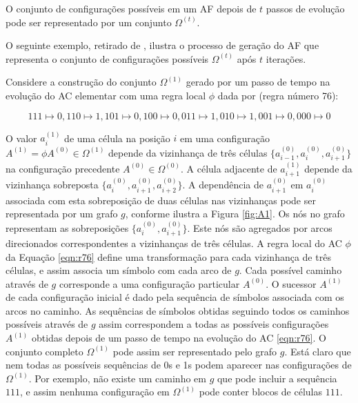 \documentclass[12pt,a4paper]{article}
\begin{document}
O conjunto de configurações possíveis em um AF depois de $t$
passos de evolução pode ser representado por um conjunto $\Omega^{(t)}$.

O seguinte exemplo, retirado de , ilustra o processo de
geração do AF que representa o conjunto de configurações
possíveis $\Omega^{(t)}$ após $t$ iterações.

Considere a construção do conjunto $\Omega^{(1)}$ gerado por um passo de
tempo na evolução do AC elementar com uma regra
local $\phi$ dada por (regra número 76):

\begin{equation}\label{eqn:r76}
111 \mapsto 0, 110 \mapsto 1, 101 \mapsto 0, 100 \mapsto 0, 011 \mapsto 1, 010 \mapsto 1,
001 \mapsto 0, 000 \mapsto 0
\end{equation}

O valor $a_i^{(1)}$ de uma célula na posição $i$ em uma configuração
$A^{(1)} = \phi A^{(0)} \in \Omega^{(1)}$ depende da vizinhança de três
células $\{a_{i-1}^{(0)},a_i^{(0)},a_{i+1}^{(0)}\}$ na configuração precedente
$A^{(0)} \in \Omega^{(0)}$. A célula adjacente de $a_{i+1}^{(1)}$ depende da
vizinhança sobreposta $\{a_i^{(0)},a_{i+1}^{(0)},a_{i+2}^{(0)}\}$. A
dependência de $a_{i+1}^{(0)}$ em $a_i^{(0)}$ associada com esta sobreposição
de duas células nas vizinhanças pode ser representada por um grafo $g$, conforme
ilustra a Figura \ref{fig:A1}. Os nós no grafo representam as sobreposições
$\{a_i^{(0)},a_{i+1}^{(0)}\}$. Este nós são agregados por arcos direcionados
correspondentes a vizinhanças de três células. A regra local do AC
$\phi$ da Equação \ref{eqn:r76} define uma transformação para cada
vizinhança de três células, e assim associa um símbolo com cada arco de $g$.
Cada possível caminho através de $g$ corresponde a uma configuração particular
$A^{(0)}$. O sucessor $A^{(1)}$ de cada configuração inicial é dado pela
sequência de símbolos associada com os arcos no caminho. As sequências de
símbolos obtidas seguindo todos os caminhos possíveis através de $g$ assim
correspondem a todas as possíveis configurações $A^{(1)}$ obtidas depois
de um passo de tempo na evolução do AC \ref{eqn:r76}. O
conjunto completo $\Omega^{(1)}$ pode assim ser representado pelo grafo
$g$. Está claro que nem todas as possíveis sequências de 0s e 1s podem
aparecer nas configurações de $\Omega^{(1)}$. Por exemplo, não existe um
caminho em $g$ que pode incluir a sequência $111$, e assim nenhuma
configuração em $\Omega^{(1)}$ pode conter blocos de células $111$.
\end{document}
